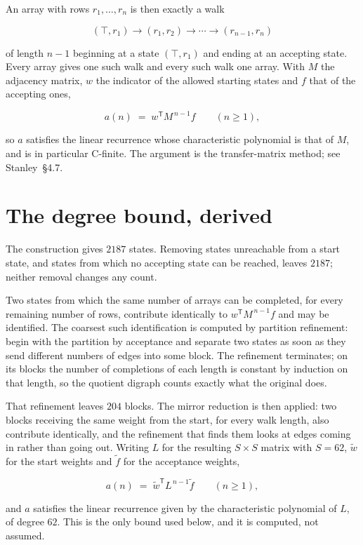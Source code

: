 \documentclass[11pt]{article}
\theoremstyle{definition}
\begin{document}
An array with rows $r_1,\dots,r_n$ is then exactly a walk

\[(\top,r_1) \to (r_1,r_2) \to \cdots \to (r_{n-1},r_n)\]

of length $n-1$ beginning at a state $(\top,r_1)$ and ending at an accepting state. Every array gives one such walk and every such walk one array. With $M$ the adjacency matrix, $w$ the indicator of the allowed starting states and $f$ that of the accepting ones,

\[a(n) \;=\; w^{\mathsf T} M^{\,n-1} f \qquad (n \ge 1),\]

so $a$ satisfies the linear recurrence whose characteristic polynomial is that of $M$, and is in particular C-finite. The argument is the transfer-matrix method; see Stanley~\S4.7.

\section{The degree bound, derived}

The construction gives $2187$ states. Removing states unreachable from a start state, and states from which no accepting state can be reached, leaves $2187$; neither removal changes any count.

Two states from which the same number of arrays can be completed, for every remaining number of rows, contribute identically to $w^{\mathsf T}M^{\,n-1}f$ and may be identified. The coarsest such identification is computed by partition refinement: begin with the partition by acceptance and separate two states as soon as they send different numbers of edges into some block. The refinement terminates; on its blocks the number of completions of each length is constant by induction on that length, so the quotient digraph counts exactly what the original does.

That refinement leaves $204$ blocks. The mirror reduction is then applied: two blocks receiving the same weight from the start, for every walk length, also contribute identically, and the refinement that finds them looks at edges coming in rather than going out. Writing $L$ for the resulting $S \times S$ matrix with $S = 62$, $\tilde w$ for the start weights and $\tilde f$ for the acceptance weights,

\[a(n) \;=\; \tilde w^{\mathsf T} L^{\,n-1} \tilde f \qquad (n \ge 1),\]

and $a$ satisfies the linear recurrence given by the characteristic polynomial of $L$, of degree $62$. This is the only bound used below, and it is computed, not assumed.
\end{document}
